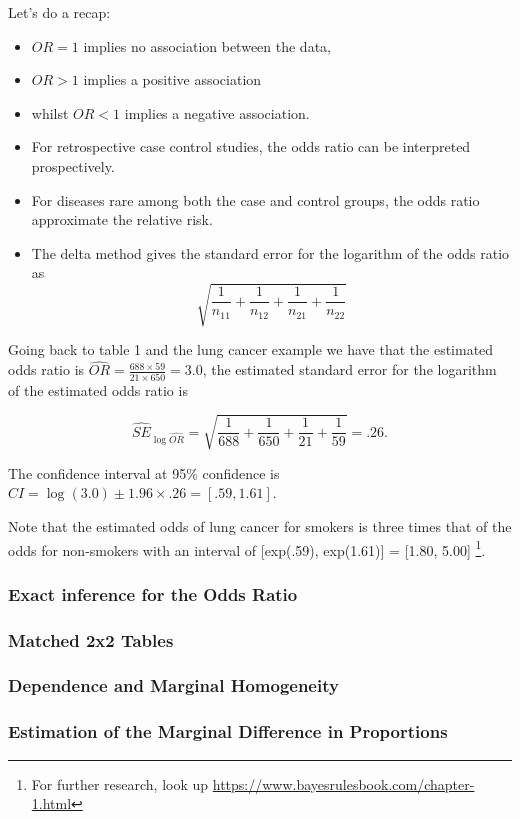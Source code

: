 \documentclass{homework}
\begin{document}
Let's do a recap:

\begin{itemize}
    \item $OR=1$ implies no association between the data, 
    \item $OR >1$ implies a positive association
    \item whilst $OR < 1$ implies a negative association. 
    \item For retrospective case control studies, the odds ratio can be interpreted prospectively.
    \item For diseases rare among both the case and control groups, the odds ratio approximate the relative risk.
    \item The delta method gives the standard error for the logarithm of the odds ratio as 
    $$
    \sqrt{\frac{1}{n_{11}}+\frac{1}{n_{12}}+\frac{1}{n_{21}}+\frac{1}{n_{22}}}
    $$
\end{itemize}

Going back to table 1 and the lung cancer example we have that the estimated odds ratio is $\hat{OR}= \frac{688 \times 59}{21 \times 650} = 3.0$, the estimated standard error for the logarithm of the estimated odds ratio is 

$$
\hat{SE}_{\log \hat{OR}} = \sqrt{\frac{1}{688}+\frac{1}{650}+\frac{1}{21}+\frac{1}{59}} = .26.
$$

The confidence interval at 95\% confidence is $CI= \log(3.0) \pm 1.96 \times .26 = [.59, 1.61]$.

Note that the estimated odds of lung cancer for smokers is three times that of the odds for non-smokers with an interval of [exp(.59), exp(1.61)] = [1.80, 5.00] \footnote{For further research, look up \url{https://www.bayesrulesbook.com/chapter-1.html}}.

\subsubsection{Exact inference for the Odds Ratio}

\subsubsection{Matched 2x2 Tables}

\subsubsection{Dependence and Marginal Homogeneity}

\subsubsection{Estimation of the Marginal Difference in Proportions}
\end{document}

